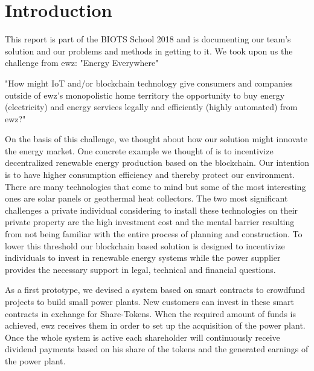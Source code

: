 %
%
\let\oldsection\section
\renewcommand\section{\clearpage\oldsection}

\section{Introduction}

This report is part of the BIOTS School 2018 and is documenting our team's solution and our problems and methods in getting to it. We took upon us the challenge from ewz: "Energy Everywhere"

"How might IoT and/or blockchain technology give consumers and companies outside of ewz’s monopolistic home territory the opportunity to buy energy (electricity) and energy services legally and efficiently (highly automated) from ewz?"

On the basis of this challenge, we thought about how our solution might innovate the energy market. One concrete example we thought of is to incentivize decentralized renewable energy production based on the blockchain. Our intention is to have higher consumption efficiency and thereby protect our environment. There are many technologies that come to mind but some of the most interesting ones are solar panels or geothermal heat collectors. The two most significant challenges a private individual considering to install these technologies on their private property are the high investment cost and the mental barrier resulting from not being familiar with the entire process of planning and construction. To lower this threshold our blockchain based solution is designed to incentivize individuals to invest in renewable energy systems while the power supplier provides the necessary support in legal, technical and financial questions.

As a first prototype, we devised a system based on smart contracts to crowdfund projects to build small power plants. New customers can invest in these smart contracts in exchange for Share-Tokens. When the required amount of funds is achieved, ewz receives them in order to set up the acquisition of the power plant. Once the whole system is active each shareholder will continuously receive dividend payments based on his share of the tokens and the generated earnings of the power plant.

